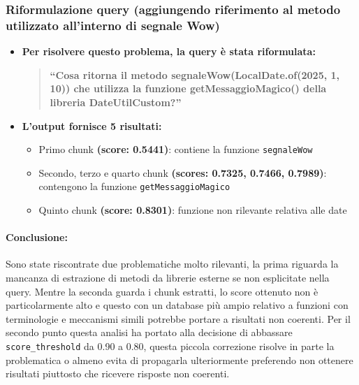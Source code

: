 \documentclass[12pt,a4paper,openright,twoside]{book}
\begin{document}
    \subsubsection{Riformulazione query (aggiungendo riferimento al metodo utilizzato all'interno di segnale Wow)}
        \begin{itemize}
            \item \textbf{Per risolvere questo problema, la query è stata riformulata:}
            \begin{quote}
                \textbf{``Cosa ritorna il metodo segnaleWow(LocalDate.of(2025, 1, 10)) che utilizza la funzione getMessaggioMagico() della libreria DateUtilCustom?''}
            \end{quote}
            \item \textbf{L'output fornisce 5 risultati:}
            \begin{itemize}
                \item Primo chunk \textbf{(score: 0.5441)}: contiene la funzione \texttt{segnaleWow}
                \item Secondo, terzo e quarto chunk \textbf{(scores: 0.7325, 0.7466, 0.7989)}: contengono la funzione \texttt{getMessaggioMagico}
                \item Quinto chunk \textbf{(score: 0.8301)}: funzione non rilevante relativa alle date
            \end{itemize}
        \end{itemize}

    \paragraph{Conclusione:}
    Sono state riscontrate due problematiche molto rilevanti, la prima riguarda la mancanza di estrazione di metodi da librerie esterne se non esplicitate nella query.
    Mentre la seconda guarda i chunk estratti, lo score ottenuto non è particolarmente alto e questo con un database più ampio relativo a funzioni con terminologie e meccanismi simili potrebbe portare a risultati non coerenti.
    Per il secondo punto questa analisi ha portato alla decisione di abbassare \texttt{score\_threshold} da 0.90 a 0.80,
    questa piccola correzione risolve in parte la problematica o almeno evita di propagarla ulteriormente preferendo non ottenere risultati piuttosto che ricevere risposte non coerenti.
    
\end{document}
